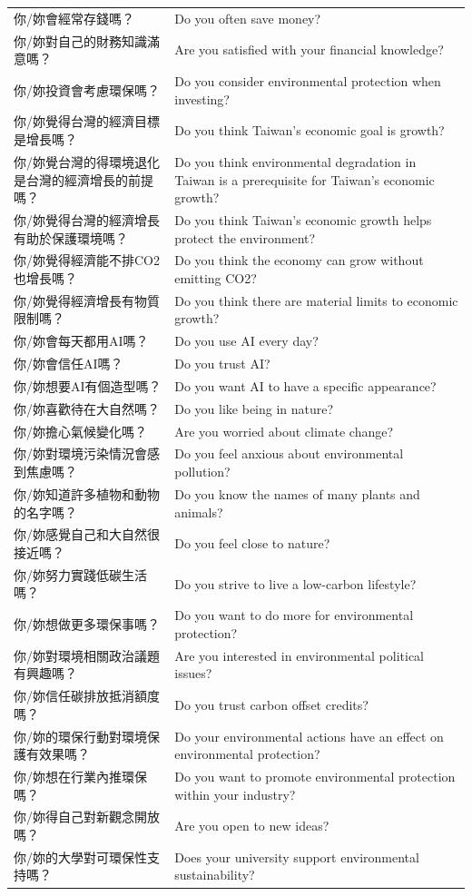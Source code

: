 \documentclass[
  letterpaper,
  DIV=11,
  numbers=noendperiod]{scrartcl}
\begin{document}
\begin{longtable}[]{@{}
  >{\raggedright\arraybackslash}p{}
  >{\raggedright\arraybackslash}p{}@{}}
你/妳會經常存錢嗎？ & Do you often save money? \\
你/妳對自己的財務知識滿意嗎？ & Are you satisfied with your financial
knowledge? \\
你/妳投資會考慮環保嗎？ & Do you consider environmental protection when
investing? \\
你/妳覺得台灣的經濟目標是增長嗎？ & Do you think Taiwan's economic goal
is growth? \\
你/妳覺台灣的得環境退化是台灣的經濟增長的前提嗎？ & Do you think
environmental degradation in Taiwan is a prerequisite for Taiwan's
economic growth? \\
你/妳覺得台灣的經濟增長有助於保護環境嗎？ & Do you think Taiwan's
economic growth helps protect the environment? \\
你/妳覺得經濟能不排CO2也增長嗎？ & Do you think the economy can grow
without emitting CO2? \\
你/妳覺得經濟增長有物質限制嗎？ & Do you think there are material limits
to economic growth? \\
你/妳會每天都用AI嗎？ & Do you use AI every day? \\
你/妳會信任AI嗎？ & Do you trust AI? \\
你/妳想要AI有個造型嗎？ & Do you want AI to have a specific
appearance? \\
你/妳喜歡待在大自然嗎？ & Do you like being in nature? \\
你/妳擔心氣候變化嗎？ & Are you worried about climate change? \\
你/妳對環境污染情況會感到焦慮嗎？ & Do you feel anxious about
environmental pollution? \\
你/妳知道許多植物和動物的名字嗎？ & Do you know the names of many plants
and animals? \\
你/妳感覺自己和大自然很接近嗎？ & Do you feel close to nature? \\
你/妳努力實踐低碳生活嗎？ & Do you strive to live a low-carbon
lifestyle? \\
你/妳想做更多環保事嗎？ & Do you want to do more for environmental
protection? \\
你/妳對環境相關政治議題有興趣嗎？ & Are you interested in environmental
political issues? \\
你/妳信任碳排放抵消額度嗎？ & Do you trust carbon offset credits? \\
你/妳的環保行動對環境保護有效果嗎？ & Do your environmental actions have
an effect on environmental protection? \\
你/妳想在行業內推環保嗎？ & Do you want to promote environmental
protection within your industry? \\
你/妳得自己對新觀念開放嗎？ & Are you open to new ideas? \\
你/妳的大學對可環保性支持嗎？ & Does your university support
environmental sustainability? \\
\end{longtable}
\end{document}

